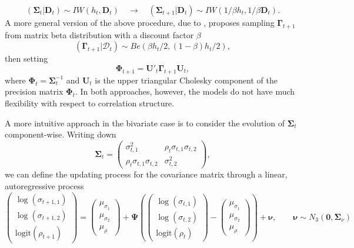 \[ \left( \boldsymbol{\Sigma}_{t} | \mathbf{D}_{t} \right) \sim IW( h_{t} , \mathbf{D}_t) \quad \to \quad \left( \boldsymbol{\Sigma}_{t+1} | \mathbf{D}_{t} \right) \sim IW( 1/\beta h_{t} , 1/\beta \mathbf{D}_t). \]
A more general version of the above procedure, due to \cite{uhlig1997bayesian}, proposes sampling $\boldsymbol{\Gamma}_{t+1}$ from matrix beta distribution with a discount factor $\beta$
\[ (\boldsymbol{\Gamma}_{t+1} | \mathcal{D}_{t}) \sim Be(\beta h_{t}/2, (1-\beta)h_{t}/2), \]
then setting 
\[ \boldsymbol{\Phi}_{t+1} = \mathbf{U}'_t \boldsymbol{\Gamma}_{t+1} \mathbf{U}_t, \]
where $\boldsymbol{\Phi}_{t} = \boldsymbol{\Sigma}^{-1}_{t}$ and $\mathbf{U}_t$ is the upper triangular Cholesky component of the precision matrix $\boldsymbol{\Phi}_t$. In both approaches, however, the models do not have much flexibility with respect to correlation structure.

A more intuitive approach in the bivariate case is to consider the evolution of $\boldsymbol{\Sigma}_{t}$ component-wise. Writing down 
\[ \boldsymbol{\Sigma}_{t} = \left( \begin{array}{cc}
				\sigma_{t,1}^2 & \rho_t \sigma_{t,1}\sigma_{t,2} \\
				\rho_t \sigma_{t,1}\sigma_{t,2} & \sigma_{t,2}^2
					\end{array} \right),
\]
we can define the updating process for the covariance matrix through a linear, autoregressive process
\[
	\left( \begin{array}{c} \log(\sigma_{t+1,1}) \\ \log(\sigma_{t+1,2}) \\ \mbox{logit}(\rho_{t+1}) \end{array} \right) = \left( \begin{array}{c} \mu_{\sigma_{1}} \\ \mu_{\sigma_{2}} \\ \mu_{\rho} \end{array} \right) + \boldsymbol{\Psi} \left( \left( \begin{array}{c} \log(\sigma_{t,1}) \\ \log(\sigma_{t,2}) \\ \mbox{logit}(\rho_{t}) \end{array} \right) - \left( \begin{array}{c} \mu_{\sigma_{1}} \\ \mu_{\sigma_{2}} \\ \mu_{\rho} \end{array} \right) \right) + \boldsymbol{\nu}, \qquad \boldsymbol{\nu} \sim N_3(\mathbf{0}, \boldsymbol{\Sigma}_\nu)
\]


